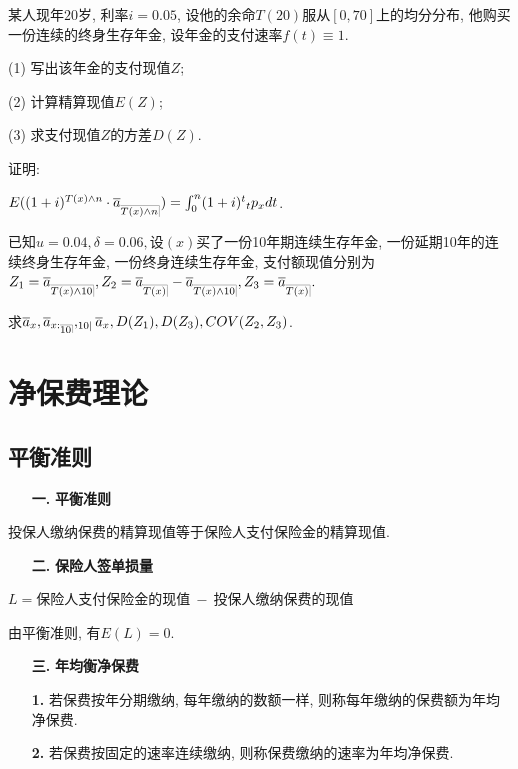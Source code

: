 \documentclass[a4paper,10pt]{ctexbook}
\makeatletter
\newcommand{\hei}{\CJKfamily{hei}}      %
\DeclareRobustCommand{\annu}[1]{_{%
    \def\arraystretch{0}%
    \setlength\arraycolsep{1pt}%
    \setlength\arrayrulewidth{.2pt}%
    \begin{array}[b]{@{}c|}\hline
        \\[\arraycolsep]%
        \scriptstyle #1%
    \end{array}%
}}
\makeatother
\begin{document}
\begin{exs}
    某人现年$20$岁, 利率$i = 0.05$, 设他的余命$T(20)$服从$[0, 70]$上的均分分布, 他购买一份连续的终身生存年金, 设年金的支付速率$f(t) \equiv 1$.

    (1) 写出该年金的支付现值$Z$;

    (2) 计算精算现值$E(Z)$;

    (3) 求支付现值$Z$的方差$D(Z)$.
\end{exs}
\begin{exs}
    证明:

    $E((1+i)^{T(x)\wedge n}\cdot \overline{a}_{\annu{T(x)\wedge n}})=\int_0^{n} (1+i)^{t}{}_tp_xdt$.
\end{exs}
\begin{exs}
    已知$u=0.04, \delta=0.06, $设$(x)$买了一份10年期连续生存年金, 一份延期10年的连续终身生存年金, 一份终身连续生存年金, 支付额现值分别为$Z_1=\overline a_{\annu {T(x) \land 10}},Z_2=\overline a_{\annu {T(x) }}-\overline a_{\annu {T(x) \land 10}}, Z_3=\overline a_{\annu {T(x) }}.$

    求$\overline a_{x},\overline a_{{x:\annu{10}}}, _{10|}\overline{a}_{x},D(Z_1), D(Z_3), COV(Z_2,Z_3)$.
\end{exs}

\chapter{净保费理论}
\section{平衡准则}
\begin{itemize}
    \item[{\bf\hei 一.}]{\bf\hei 平衡准则}
\end{itemize}

投保人缴纳保费的精算现值等于保险人支付保险金的精算现值.
\begin{itemize}
    \item[{\bf\hei 二.}]{\bf\hei 保险人签单损量}
\end{itemize}

$L=$保险人支付保险金的现值$~-~$投保人缴纳保费的现值

由平衡准则, 有$E(L)=0$.

\begin{itemize}
    \item[{\bf\hei 三.}]{\bf\hei 年均衡净保费}
\end{itemize}
\begin{itemize}
    \item[{\bf\hei 1.}] 若保费按年分期缴纳, 每年缴纳的数额一样, 则称每年缴纳的保费额为年均净保费.
\end{itemize}
\begin{itemize}
    \item[{\bf\hei 2.}] 若保费按固定的速率连续缴纳, 则称保费缴纳的速率为年均净保费.
\end{itemize}
\end{document}
